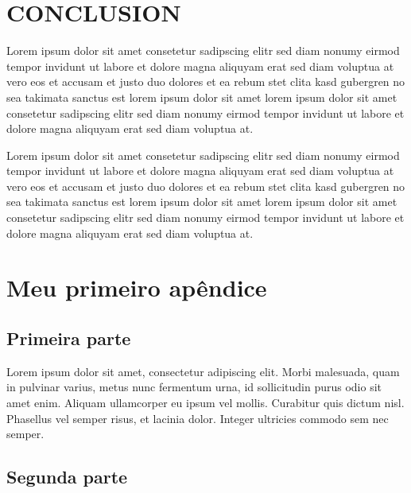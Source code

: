 \documentclass[sigconf]{acmart}
\begin{document}
\section{CONCLUSION}

Lorem ipsum dolor sit amet consetetur sadipscing elitr sed diam
nonumy eirmod tempor invidunt ut labore et dolore magna aliquyam
erat sed diam voluptua at vero eos et accusam et justo duo dolores
et ea rebum stet clita kasd gubergren no sea takimata sanctus est
lorem ipsum dolor sit amet lorem ipsum dolor sit amet consetetur
sadipscing elitr sed diam nonumy eirmod tempor invidunt ut labore
et dolore magna aliquyam erat sed diam voluptua at.

Lorem ipsum dolor sit amet consetetur sadipscing elitr sed diam
nonumy eirmod tempor invidunt ut labore et dolore magna aliquyam
erat sed diam voluptua at vero eos et accusam et justo duo dolores
et ea rebum stet clita kasd gubergren no sea takimata sanctus est
lorem ipsum dolor sit amet lorem ipsum dolor sit amet consetetur
sadipscing elitr sed diam nonumy eirmod tempor invidunt ut labore
et dolore magna aliquyam erat sed diam voluptua at.




\appendix

\section{Meu primeiro apêndice}

\subsection{Primeira parte}

Lorem ipsum dolor sit amet, consectetur adipiscing elit. Morbi
malesuada, quam in pulvinar varius, metus nunc fermentum urna, id
sollicitudin purus odio sit amet enim. Aliquam ullamcorper eu ipsum
vel mollis. Curabitur quis dictum nisl. Phasellus vel semper risus, et
lacinia dolor. Integer ultricies commodo sem nec semper.

\subsection{Segunda parte}
\end{document}
